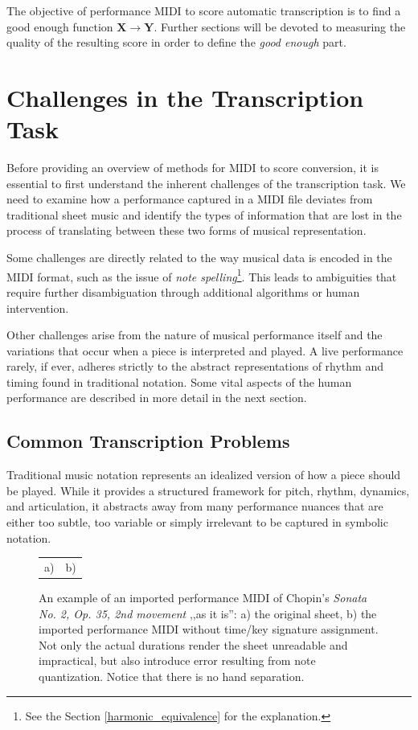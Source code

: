 The objective of performance MIDI to score automatic transcription is to find a good enough function $\mathbf{X}\to\mathbf{Y}$. Further sections will be devoted to measuring the quality of the resulting score in order to define the \emph{good enough} part. 

\section{Challenges in the Transcription Task}

Before providing an overview of methods for MIDI to score conversion, it is essential to first understand the inherent challenges of the transcription task. We need to examine how a performance captured in a MIDI file deviates from traditional sheet music and identify the types of information that are lost in the process of translating between these two forms of musical representation.

Some challenges are directly related to the way musical data is encoded in the MIDI format, such as the issue of \emph{note spelling}\footnote{See the Section \ref{harmonic_equivalence} for the explanation.}. This leads to ambiguities that require further disambiguation through additional algorithms or human intervention.

Other challenges arise from the nature of musical performance itself and the variations that occur when a piece is interpreted and played. A live performance rarely, if ever, adheres strictly to the abstract representations of rhythm and timing found in traditional notation. Some vital aspects of the human performance are described in more detail in the next section.

\subsection{Common Transcription Problems}

Traditional music notation represents an idealized version of how a piece should be played. While it provides a structured framework for pitch, rhythm, dynamics, and articulation, it abstracts away from many performance nuances that are either too subtle, too variable or simply irrelevant to be captured in symbolic notation.

\begin{figure}[ht!]
\centering
\begin{tabular}{cc}a)

 & b)
\end{tabular}
\caption{An example of an imported performance MIDI of Chopin's \emph{Sonata No. 2, Op. 35, 2nd movement} ,,as it is'': a) the original sheet, b) the imported performance MIDI without time/key signature assignment. Not only the actual durations render the sheet unreadable and impractical, but also introduce error resulting from note quantization. Notice that there is no hand separation.}
\label{chopin_sonata}
\end{figure}

